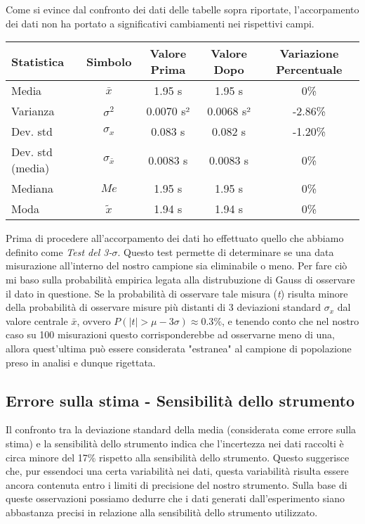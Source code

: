 \documentclass{article}
\begin{document}
\noindent
Come si evince dal confronto dei dati delle tabelle sopra riportate, l'accorpamento dei dati non ha portato a significativi cambiamenti nei rispettivi campi.
\newline 
\begin{table}[ht]
\centering
{}
\begin{tabular}{lcccc}
\toprule
\textbf{Statistica} & \textbf{Simbolo} & \textbf{Valore Prima} & \textbf{Valore Dopo} & \textbf{Variazione Percentuale} \\
\midrule
Media & $\bar{x}$ & 1.95 s & 1.95 s & 0\% \\
Varianza & $\sigma^2$ & 0.0070 s² & 0.0068 s² & -2.86\% \\
Dev. std & $\sigma_x$ & 0.083 s & 0.082 s & -1.20\% \\
Dev. std (media) & $\sigma_{\bar{x}}$ & 0.0083 s & 0.0083 s & 0\% \\
Mediana & $Me$ & 1.95 s & 1.95 s & 0\% \\
Moda & $\tilde{x}$ & 1.94 s & 1.94 s & 0\% \\
\bottomrule
\end{tabular}
\label{tab:dati_accorpati}
\end{table}

Prima di procedere all'accorpamento dei dati ho effettuato quello che abbiamo definito come \textit{Test del 3-$\sigma$}. Questo test permette di determinare se una data misurazione all'interno del nostro campione sia eliminabile o meno. Per fare ciò mi baso sulla probabilità empirica legata alla distrubuzione di Gauss di osservare il dato in questione.
\newline\indent
Se la probabilità di osservare tale misura (\textit{t}) risulta minore della probabilità di osservare misure più distanti di 3 deviazioni standard $\sigma_x$ dal valore centrale $\bar{x}$, ovvero $P( |t| > \mu - 3\sigma) \approx 0.3\% $, e tenendo conto che nel nostro caso su 100 misurazioni questo corrisponderebbe ad osservarne meno di una, allora quest'ultima può essere considerata "estranea" al campione di popolazione preso in analisi e dunque rigettata.
\newline
\subsection{Errore sulla stima - Sensibilità dello strumento}
Il confronto tra la deviazione standard della media (considerata come errore sulla stima) e la sensibilità dello strumento indica che l'incertezza nei dati raccolti è circa minore del 17\% rispetto alla sensibilità dello strumento. Questo suggerisce che, pur essendoci una certa variabilità nei dati, questa variabilità risulta essere ancora contenuta entro i limiti di precisione del nostro strumento. Sulla base di queste osservazioni possiamo dedurre che i dati generati dall'esperimento siano abbastanza precisi in relazione alla sensibilità dello strumento utilizzato.
\end{document}
